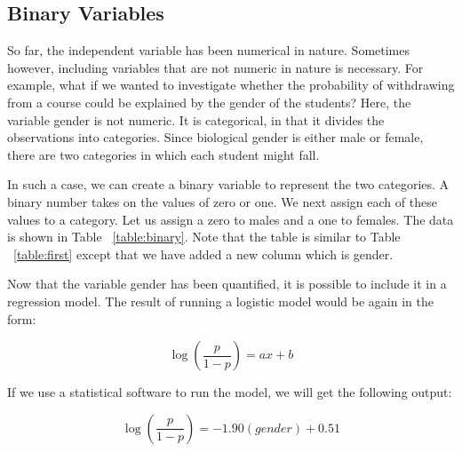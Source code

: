 \documentclass[a4paper,12pt,oneside]{book}
\begin{document}
\subsection{Binary Variables}
So far, the independent variable has been numerical in nature. Sometimes however, including variables that are not numeric in nature is necessary. For example, what if we wanted to investigate whether the 
probability of withdrawing from a course could be explained by the gender of the students? Here, the variable gender is not numeric. It is categorical, in that it divides the observations into categories. 
Since biological gender is either male or female, there are two categories in which each student might fall.

In such a case, we can create a binary variable to represent the two categories. A binary number takes on the values of zero or one. We next assign each of these values to a category. 
Let us assign a zero to males and a one to females. The data is shown in Table ~\ref{table:binary}. Note that the table is similar to Table ~\ref{table:first} except that we have added a new column which is gender.

Now that the variable gender has been quantified, it is possible to include it in a regression model. The result of running a logistic model would be again in the form:

$$ \log(\frac{p}{1-p})=ax+b $$

If we use a statistical software to run the model, we will get the following output:

$$ \log(\frac{p}{1-p})=-1.90(gender)+0.51 $$
\end{document}

